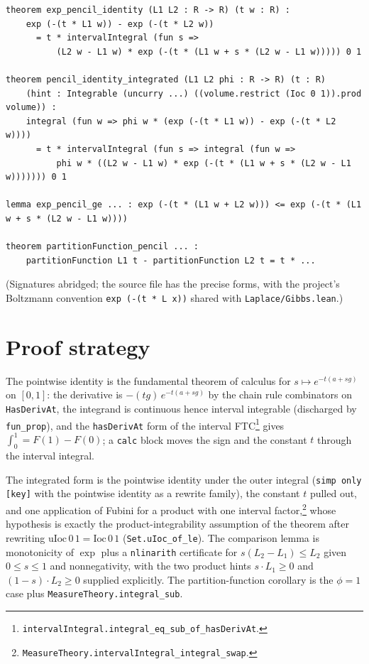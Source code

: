 \documentclass[11pt]{article}
\begin{document}
\begin{lstlisting}
theorem exp_pencil_identity (L1 L2 : R -> R) (t w : R) :
    exp (-(t * L1 w)) - exp (-(t * L2 w))
      = t * intervalIntegral (fun s =>
          (L2 w - L1 w) * exp (-(t * (L1 w + s * (L2 w - L1 w))))) 0 1

theorem pencil_identity_integrated (L1 L2 phi : R -> R) (t : R)
    (hint : Integrable (uncurry ...) ((volume.restrict (Ioc 0 1)).prod volume)) :
    integral (fun w => phi w * (exp (-(t * L1 w)) - exp (-(t * L2 w))))
      = t * intervalIntegral (fun s => integral (fun w =>
          phi w * ((L2 w - L1 w) * exp (-(t * (L1 w + s * (L2 w - L1 w))))))) 0 1

lemma exp_pencil_ge ... : exp (-(t * (L1 w + L2 w))) <= exp (-(t * (L1 w + s * (L2 w - L1 w))))

theorem partitionFunction_pencil ... :
    partitionFunction L1 t - partitionFunction L2 t = t * ...
\end{lstlisting}

(Signatures abridged; the source file has the precise forms, with the
project's Boltzmann convention \texttt{exp (-(t * L x))} shared with
\texttt{Laplace/Gibbs.lean}.)

\section{Proof strategy}

The pointwise identity is the fundamental theorem of calculus for
$s \mapsto e^{-t(a + sg)}$ on $[0,1]$: the derivative is
$-(tg)\,e^{-t(a+sg)}$ by the chain rule combinators on
\texttt{HasDerivAt}, the integrand is continuous hence interval
integrable (discharged by \texttt{fun\_prop}), and the
\texttt{hasDerivAt} form of the interval FTC\footnote{%
\texttt{intervalIntegral.integral\_eq\_sub\_of\_hasDerivAt}.} gives
$\int_0^1 = F(1) - F(0)$; a \texttt{calc} block moves the sign and the
constant $t$ through the interval integral.

The integrated form is the pointwise identity under the outer integral
(\texttt{simp only [key]} with the pointwise identity as a rewrite family),
the constant $t$ pulled out, and one application of Fubini for a product
with one interval factor,\footnote{%
\texttt{MeasureTheory.intervalIntegral\_integral\_swap}.} whose hypothesis
is exactly the product-integrability assumption of the theorem after
rewriting $\mathrm{uIoc}\,0\,1 = \mathrm{Ioc}\,0\,1$
(\texttt{Set.uIoc\_of\_le}).
The comparison lemma is monotonicity of $\exp$ plus a
\texttt{nlinarith} certificate for
$s(L_2 - L_1) \le L_2$ given $0 \le s \le 1$ and nonnegativity, with the
two product hints $s \cdot L_1 \ge 0$ and $(1-s) \cdot L_2 \ge 0$ supplied
explicitly. The partition-function corollary is the $\phi = 1$ case plus
\texttt{MeasureTheory.integral\_sub}.
\end{document}

